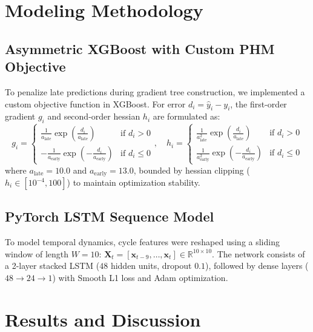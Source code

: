 \documentclass[12pt]{article}
\begin{document}
\section{Modeling Methodology}

\subsection{Asymmetric XGBoost with Custom PHM Objective}
To penalize late predictions during gradient tree construction, we implemented a custom objective function in XGBoost. For error $d_i = \hat{y}_i - y_i$, the first-order gradient $g_i$ and second-order hessian $h_i$ are formulated as:
\begin{equation}
g_i = \begin{cases} 
\frac{1}{a_{\text{late}}} \exp\left(\frac{d_i}{a_{\text{late}}}\right) & \text{if } d_i > 0 \\[6pt]
-\frac{1}{a_{\text{early}}} \exp\left(-\frac{d_i}{a_{\text{early}}}\right) & \text{if } d_i \le 0 
\end{cases}, \quad
h_i = \begin{cases} 
\frac{1}{a_{\text{late}}^2} \exp\left(\frac{d_i}{a_{\text{late}}}\right) & \text{if } d_i > 0 \\[6pt]
\frac{1}{a_{\text{early}}^2} \exp\left(-\frac{d_i}{a_{\text{early}}}\right) & \text{if } d_i \le 0 
\end{cases}
\end{equation}
where $a_{\text{late}} = 10.0$ and $a_{\text{early}} = 13.0$, bounded by hessian clipping ($h_i \in [10^{-4}, 100]$) to maintain optimization stability.

\subsection{PyTorch LSTM Sequence Model}
To model temporal dynamics, cycle features were reshaped using a sliding window of length $W = 10$: $\mathbf{X}_t = [\mathbf{x}_{t-9}, \dots, \mathbf{x}_t] \in \mathbb{R}^{10 \times 10}$. The network consists of a 2-layer stacked LSTM ($48$ hidden units, dropout $0.1$), followed by dense layers ($48 \rightarrow 24 \rightarrow 1$) with Smooth L1 loss and Adam optimization.

\section{Results and Discussion}
\end{document}
